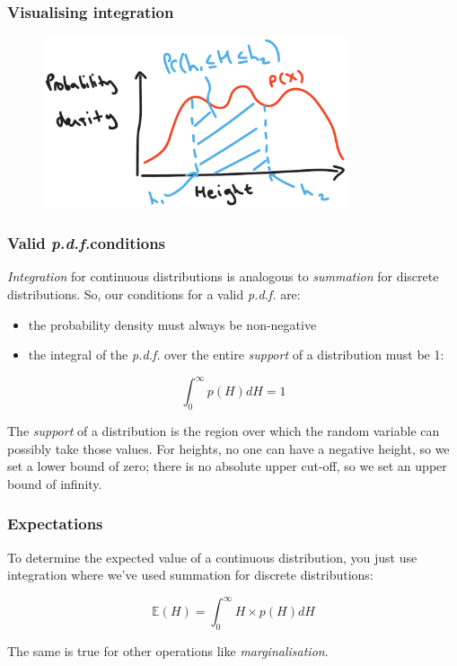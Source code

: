 \documentclass{beamer}
\begin{document}
	\begin{frame}
		\frametitle{Visualising integration}
		
		\begin{figure}[ht]
			\centerline{\includegraphics[width=0.8\textwidth]{./figures/height_density_area.pdf}}
		\end{figure}
		
	\end{frame}
	
	\begin{frame}
		\frametitle{Valid \textit{p.d.f.}conditions}
		
		\textit{Integration} for continuous distributions is analogous to \textit{summation} for discrete distributions. So, our conditions for a valid \textit{p.d.f.} are:
		
		\begin{itemize}
			\item the probability density must always be non-negative
			\item the integral of the \textit{p.d.f.} over the entire \textit{support} of a distribution must be 1:
		\end{itemize}
		
		\begin{equation}
		\int_{0}^{\infty} p(H) dH = 1
		\end{equation}
		
		The \textit{support} of a distribution is the region over which the random variable can possibly take those values. For heights, no one can have a negative height, so we set a lower bound of zero; there is no absolute upper cut-off, so we set an upper bound of infinity.
		
	\end{frame}
	
	\begin{frame}
		\frametitle{Expectations}
		
		To determine the expected value of a continuous distribution, you just use integration where we've used summation for discrete distributions:
		
		\begin{equation}
		\mathbb{E}(H) = \int_{0}^{\infty} H \times p(H) dH
		\end{equation}
		
		The same is true for other operations like \textit{marginalisation}.
		
	\end{frame}
	
\end{document}
